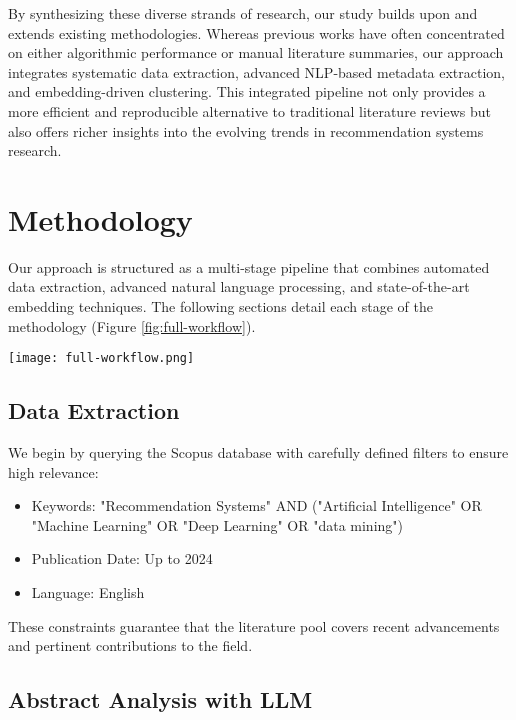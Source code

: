 \documentclass[
	a4paper, %
	10pt, %
	unnumberedsections, %
	twoside, %
]{LTJournalArticle}
\begin{document}
By synthesizing these diverse strands of research, our study builds upon and extends existing methodologies. Whereas previous works have often concentrated on either algorithmic performance or manual literature summaries, our approach integrates systematic data extraction, advanced NLP-based metadata extraction, and embedding-driven clustering. This integrated pipeline not only provides a more efficient and reproducible alternative to traditional literature reviews but also offers richer insights into the evolving trends in recommendation systems research.


\section{Methodology}

Our approach is structured as a multi-stage pipeline that combines automated data extraction, advanced natural language processing, and state-of-the-art embedding techniques. The following sections detail each stage of the methodology (Figure \ref{fig:full-workflow}).

\begin{figure*}[htbp]
    \centering
    \texttt{[image: full-workflow.png]}
    \caption{Full Workflow}
    \label{fig:full-workflow}
\end{figure*}

\subsection{Data Extraction}

We begin by querying the Scopus database with carefully defined filters to ensure high relevance:

\begin{itemize}
    \item Keywords: "Recommendation Systems" AND ("Artificial Intelligence" OR "Machine Learning" OR "Deep Learning" OR "data mining")  
    \item Publication Date: Up to 2024    
    \item Language: English  
\end{itemize}

These constraints guarantee that the literature pool covers recent advancements and pertinent contributions to the field.

\subsection{Abstract Analysis with LLM}
\end{document}
